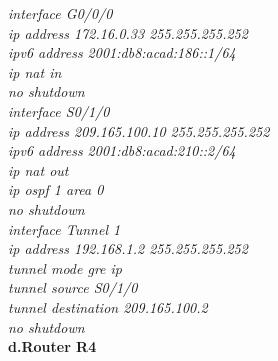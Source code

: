 \documentclass[12pt,a4paper]{report}
\begin{document}
\hspace*{2cm}\textit{interface G0/0/0\\
\hspace*{2cm}ip address 172.16.0.33 255.255.255.252\\
\hspace*{2cm}ipv6 address 2001:db8:acad:186::1/64\\
\hspace*{2cm}ip nat in\\
\hspace*{2cm}no shutdown\\
\hspace*{2cm}interface S0/1/0\\
\hspace*{2cm}ip address 209.165.100.10 255.255.255.252\\
\hspace*{2cm}ipv6 address 2001:db8:acad:210::2/64\\
\hspace*{2cm}ip nat out\\
\hspace*{2cm}ip ospf 1 area 0\\
\hspace*{2cm}no shutdown\\
\hspace*{2cm}interface Tunnel 1\\
\hspace*{2cm}ip address 192.168.1.2 255.255.255.252\\
\hspace*{2cm}tunnel mode gre ip\\
\hspace*{2cm}tunnel source S0/1/0\\
\hspace*{2cm}tunnel destination 209.165.100.2\\
\hspace*{2cm}no shutdown\\}
\hspace*{1cm}\textbf{d.Router R4} \\
\end{document}
